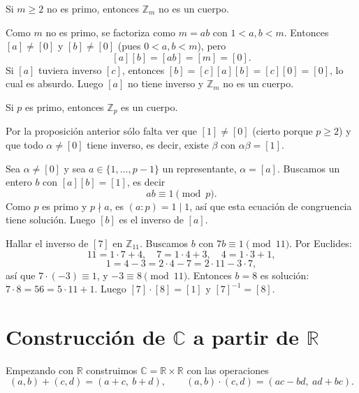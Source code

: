 \begin{proposicion}
Si $m\ge 2$ no es primo, entonces $\mathbb{Z}_m$ no es un cuerpo.
\end{proposicion}

\begin{demostracion}
Como $m$ no es primo, se factoriza como $m=ab$ con $1<a,b<m$. Entonces
$[a]\neq[0]$ y $[b]\neq[0]$ (pues $0<a,b<m$), pero
\[
[a][b]=[ab]=[m]=[0].
\]
Si $[a]$ tuviera inverso $[c]$, entonces $[b]=[c][a][b]=[c][0]=[0]$, lo cual es
absurdo. Luego $[a]$ no tiene inverso y $\mathbb{Z}_m$ no es un cuerpo.
\end{demostracion}

\begin{proposicion}
Si $p$ es primo, entonces $\mathbb{Z}_p$ es un cuerpo.
\end{proposicion}

\begin{demostracion}
Por la proposición anterior sólo falta ver que $[1]\neq[0]$ (cierto porque $p\ge 2$)
y que todo $\alpha\neq[0]$ tiene inverso, es decir, existe $\beta$ con
$\alpha\beta=[1]$.

Sea $\alpha\neq[0]$ y sea $a\in\{1,\dots,p-1\}$ un representante, $\alpha=[a]$.
Buscamos un entero $b$ con $[a][b]=[1]$, es decir
\[
ab\equiv 1 \pmod p.
\]
Como $p$ es primo y $p\nmid a$, es $(a:p)=1\mid 1$, así que esta ecuación de
congruencia tiene solución. Luego $[b]$ es el inverso de $[a]$.
\end{demostracion}

\begin{ejemplo}
Hallar el inverso de $[7]$ en $\mathbb{Z}_{11}$. Buscamos $b$ con
$7b\equiv 1 \pmod{11}$. Por Euclides:
\[
11=1\cdot 7+4,\quad 7=1\cdot 4+3,\quad 4=1\cdot 3+1,
\]
\[
1=4-3=2\cdot 4-7=2\cdot 11-3\cdot 7,
\]
así que $7\cdot(-3)\equiv 1$, y $-3\equiv 8 \pmod{11}$. Entonces $b=8$ es solución:
$7\cdot 8=56=5\cdot 11+1$. Luego $[7]\cdot[8]=[1]$ y $[7]^{-1}=[8]$.
\end{ejemplo}

\section{Construcción de $\mathbb{C}$ a partir de $\mathbb{R}$}

\begin{definicion}
Empezando con $\mathbb{R}$ construimos $\mathbb{C}=\mathbb{R}\times\mathbb{R}$ con las
operaciones
\[
(a,b)+(c,d)=(a+c,\ b+d), \qquad (a,b)\cdot(c,d)=(ac-bd,\ ad+bc).
\]
\end{definicion}

